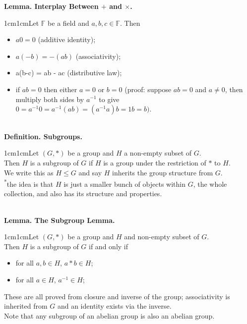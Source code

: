 \documentclass{article}
\newcommand{\definition}[2]{\textbf{Definition. #1.}\begin{adjustwidth}{1cm}{1cm}#2\end{adjustwidth}}
\newcommand{\lemma}[2]{\textbf{Lemma. #1.}\begin{adjustwidth}{1cm}{1cm}#2\end{adjustwidth}}
\begin{document}
\lemma{Interplay Between $+$ and $\times$}{Let $\mathbb{F}$ be a field and $a,b,c \in \mathbb{F}$. Then\begin{itemize}\item $a0 = 0$ (additive identity); \item $a(-b) = -(ab)$ (associativity); \item a(b-c) = ab - ac (distributive law); \item if $ab = 0$ then either $a = 0$ or $b = 0$ (proof: suppose $ab = 0$ and $a \neq 0$, then multiply both sides by $a^{-1}$ to give $0 = a^{-1}0 = a^{-1}(ab) = (a^{-1}a)b = 1b = b)$.\end{itemize}}~\\
\definition{Subgroups}{Let $(G,*)$ be a group and $H$ a non-empty subset of $G$.\\Then $H$ is a subgroup of $G$ if $H$ is a group under the restriction of $*$ to $H$.\\We write this as $H \leq G$ and say $H$ inherits the group structure from $G$.\\[1\baselineskip]\textsuperscript{*}the idea is that $H$ is just a smaller bunch of objects within $G$, the whole collection, and also has its structure and properties.}~\\
\lemma{The Subgroup Lemma}{Let $(G, *)$ be a group and $H$ and non-empty subset of $G$.\\Then $H$ is a subgroup of $G$ if and only if \begin{itemize}
  \item for all $a,b \in H$, $a * b \in H$;
  \item for all $a \in H$, $a^{-1} \in H$;
\end{itemize}These are all proved from closure and inverse of the group; associativity is inherited from $G$ and an identity exists via the inverse.\\[1\baselineskip]Note that any subgroup of an abelian group is also an abelian group.}~\\
\end{document}
